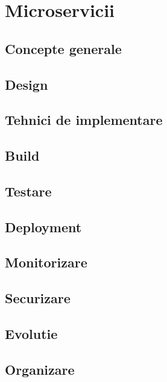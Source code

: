 \chapter{Microservicii}
\section{Concepte generale}

\section{Design}  

\section{Tehnici de implementare}

\section{Build}

\section{Testare} 

\section{Deployment}

\section{Monitorizare}

\section{Securizare}

\section{Evolutie}

\section{Organizare}

